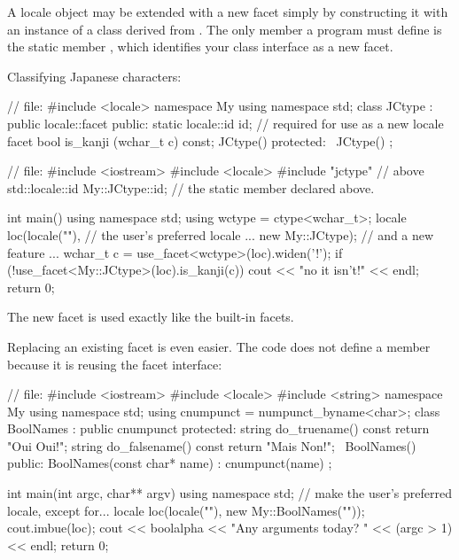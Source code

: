 \pnum
A locale object may be extended with a new facet simply by constructing
it with an instance of a class derived from
.
The only member a \Cpp program must define is the static member
,
which identifies your class interface as a new facet.

\pnum
\begin{example}
Classifying Japanese characters:

\begin{codeblock}
// file: 
#include <locale>
namespace My {
  using namespace std;
  class JCtype : public locale::facet {
  public:
    static locale::id id;       // required for use as a new locale facet
    bool is_kanji (wchar_t c) const;
    JCtype() { }
  protected:
    ~JCtype() { }
  };
}

// file: 
#include <iostream>
#include <locale>
#include "jctype"               // above
std::locale::id My::JCtype::id; // the static  member declared above.

int main() {
  using namespace std;
  using wctype = ctype<wchar_t>;
  locale loc(locale(""),        // the user's preferred locale ...
         new My::JCtype);       // and a new feature ...
  wchar_t c = use_facet<wctype>(loc).widen('!');
  if (!use_facet<My::JCtype>(loc).is_kanji(c))
    cout << "no it isn't!" << endl;
  return 0;
}
\end{codeblock}

\pnum
The new facet is used exactly like the built-in facets.
\end{example}

\pnum
\begin{example}
Replacing an existing facet is even easier.
The code does not define a member
because it is reusing the
facet interface:

\begin{codeblock}
// file: 
#include <iostream>
#include <locale>
#include <string>
namespace My {
  using namespace std;
  using cnumpunct = numpunct_byname<char>;
  class BoolNames : public cnumpunct {
  protected:
    string do_truename()  const { return "Oui Oui!"; }
    string do_falsename() const { return "Mais Non!"; }
    ~BoolNames() { }
  public:
    BoolNames(const char* name) : cnumpunct(name) { }
  };
}

int main(int argc, char** argv) {
  using namespace std;
  // make the user's preferred locale, except for...
  locale loc(locale(""), new My::BoolNames(""));
  cout.imbue(loc);
  cout << boolalpha << "Any arguments today? " << (argc > 1) << endl;
  return 0;
}
\end{codeblock}
\end{example}

